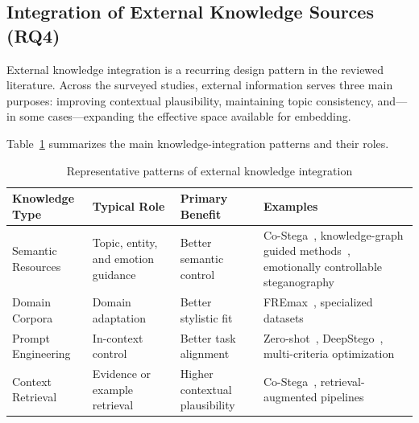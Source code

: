 \subsection{Integration of External Knowledge Sources (RQ4)}
\label{subsec:rq4}

External knowledge integration is a recurring design pattern in the reviewed literature. Across the surveyed studies, external information serves three main purposes: improving contextual plausibility, maintaining topic consistency, and---in some cases---expanding the effective space available for embedding.

Table~\ref{tab:knowledge_integration} summarizes the main knowledge-integration patterns and their roles.


\begin{table}[t]
  \centering
  \small
  \caption{Representative patterns of external knowledge integration}
  \label{tab:knowledge_integration}
  \begin{tabular}{|>{\raggedright\arraybackslash}p{3cm}|>{\raggedright\arraybackslash}p{2.2cm}|>{\raggedright\arraybackslash}p{3cm}|>{\raggedright\arraybackslash}p{5.2cm}|}
    \hline
    \textbf{Knowledge Type} & \textbf{Typical Role}               & \textbf{Primary Benefit}       & \textbf{Examples}                                                                \\
    \hline
    Semantic Resources      & Topic, entity, and emotion guidance & Better semantic control        & Co-Stega~\cite{liao2024co}, knowledge-graph guided methods~\cite{li2024semantic,ding2023joint}, emotionally controllable steganography~\cite{shi2025emotionally} \\
    \hline
    Domain Corpora          & Domain adaptation                   & Better stylistic fit           & FREmax~\cite{pang2024fremax}, specialized datasets                                                     \\
    \hline
    Prompt Engineering      & In-context control                  & Better task alignment          & Zero-shot~\cite{lin2024zero}, DeepStego~\cite{kuznetsov2025deepstego}, multi-criteria optimization~\cite{wozniak2025multicriteria}                                \\
    \hline
    Context Retrieval       & Evidence or example retrieval       & Higher contextual plausibility & Co-Stega~\cite{liao2024co}, retrieval-augmented pipelines~\cite{wang2023hi}                                          \\
    \hline
  \end{tabular}
\end{table}

